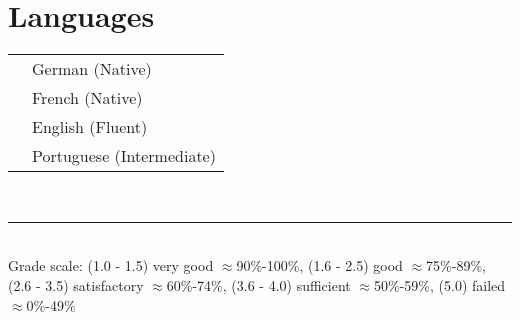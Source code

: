 \documentclass[oneside]{article}
\begin{document}
{\begin{minipage}[t][\textheight-2\fboxsep-2\fboxrule][t]{\dimexpr0.40\textwidth-2\fboxrule-2\fboxsep\relax}
        \section*{\large Languages}
        \begin{tabular}{cl}
            \faLanguage{} & German (Native) \\
            \faLanguage{} & French (Native) \\
            \faLanguage{} & English (Fluent) \\
            \faLanguage{} & Portuguese (Intermediate)
        \end{tabular}
        \vspace{.3cm}
        \\
        \rule{\linewidth}{0.4pt}
        \\
        \vfill
        {\tiny Grade scale: (1.0 - 1.5) very good $\approx$90\%-100\%, (1.6 - 2.5) good $\approx$75\%-89\%, (2.6 - 3.5) satisfactory $\approx$60\%-74\%, (3.6 - 4.0) sufficient $\approx$50\%-59\%, (5.0) failed $\approx$0\%-49\%}
    \end{minipage}
}
\hfill
\end{document}
